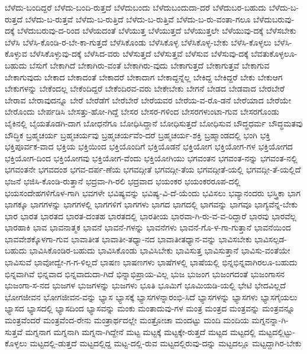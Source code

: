 {ಬೆಳೆದು-ಬಂದಿದ್ದರೆ
ಬೆಳೆದು-ಬಂದಿ-ರುತ್ತದೆ
ಬೆಳೆದುಬಂದು
ಬೆಳೆದುಬಂದುದಾ-ದರೆ
ಬೆಳೆದುಬರ-ಬಹುದು
ಬೆಳೆದು-ಬ-ರುತ್ತದೆ
ಬೆಳೆದು-ಬ-ರುತ್ತವೆ
ಬೆಳೆದು-ಬ-ರುತ್ತಿದೆ
ಬೆಳೆದು-ಬ-ರುತ್ತಿವೆ
ಬೆಳೆದು-ಬ-ರು-ವಂತಾ-ಗಲೂ
ಬೆಳೆದುಬರುವು-ದಕ್ಕೆ
ಬೆಳೆದುಬರುವು-ದ-ರಿಂದ
ಬೆಳೆಯದಂತೆ
ಬೆಳೆಯುತ್ತ
ಬೆಳೆಯುತ್ತದೆ
ಬೆಳೆಯುತ್ತಲೇ
ಬೆಳೆಯುವು-ದಕ್ಕೆ
ಬೆಳೆಸಬೇಕು
ಬೆಳೆಸಿ
ಬೆಳೆಸಿ-ಕೊಂಡಿ-ರ-ಬೇ-ಕಾ-ಗುತ್ತದೆ
ಬೆಳೆಸಿಕೊಂಡು
ಬೆಳೆಸಿಕೊಳ್ಳ
ಬೆಳೆಸಿಕೊಳ್ಳ-ಬೇಕು
ಬೆಳೆಸಿ-ಕೊಳ್ಳಲು
ಬೆಳೆಸಿ-ಕೊಳ್ಳುವ
ಬೆಳೆಸಿಕೊಳ್ಳುವು-ದಕ್ಕೆ
ಬೆಳೆಸಿದ-ವರು
ಬೆಳೆಸುತ್ತದೆ
ಬೆಳೆಸುತ್ತವೆ
ಬೆಳೆಸುವ
ಬೆಳೆಸುವು-ದಕ್ಕೆ
ಬೆವತುಕೊಳ್ಳಲೂ-ಬಹುದು
ಬೆಸುಗೆ
ಬೇಕಾಗಿದೆ
ಬೇಕಾಗಿರು-ವಂತೆ
ಬೇಕಾಗಿರು-ವುದು
ಬೇಕಾಗುತ್ತದೆ
ಬೇಕಾಗುತ್ತವೆ
ಬೇಕಾಗುವ
ಬೇಕಾಗುವುದು
ಬೇಕಾದ
ಬೇಕಾದಂತೆ
ಬೇಕಾದರೆ
ಬೇಕಾದಾಗ
ಬೇಕಾದ್ದನ್ನೆಲ್ಲ
ಬೇಕಿದ್ದ
ಬೇಕಿದ್ದರೆ
ಬೇಕು
ಬೇಕುಆಗ
ಬೇಕುಗಳನ್ನು
ಬೇಕೆಂದಲ್ಲ
ಬೇಕೆಂದಿದ್ದರೆ
ಬೇಕೆಂದಿರವ-ವರು
ಬೇಕೇಬೇಕು
ಬೇಗನೆ
ಬೇಡದ
ಬೇಡವಾದ
ಬೇರಬೇರೆ
ಬೇರಾವ
ಬೇರಾವುದನ್ನೂ
ಬೇರೆ
ಬೇರೆಡೆಗೆ
ಬೇರೆಬೇರೆ
ಬೇರೆಯವರ
ಬೇರೆಯ-ವ-ರೊ-ಡನೆ
ಬೇರೆಯಾದ
ಬೇರೆಯೇ
ಬೇರೊಂದು
ಬೇರ್ಪಡಿಸಿ
ಬೇಸತ್ತು-ಹೋ-ಗಿದ್ದೆ
ಬೇಸರ
ಬೇಸರ-ಗಳಿಂದ
ಬೇಸರಗಳುಂಟಾ-ಗುವ
ಬೇಸರಗೊಂಡು
ಬೈಕಿನಲ್ಲಿ
ಬೈಯತೊಡಗಿ-ದಾಗ
ಬೋಧನೆಗೂ
ಬೋಧಿಸಿದ್ದಾನೆ
ಬೋಧಿಸುತ್ತದೆ
ಬೋಧಿಸುವ
ಬೌದ್ಧಧರ್ಮ
ಬೌದ್ಧಮತವು
ಬೌದ್ಧಿಕ
ಬ್ರಹ್ಮಚರ್ಯ
ಬ್ರಹ್ಮಚರ್ಯವು
ಬ್ರಹ್ಮಚರ್ಯವೆಂ-ದರೆ
ಬ್ರಹ್ಮಚರ್ಯ-ಶಕ್ತಿ
ಬ್ರಹ್ಮಾಂಡದಲ್ಲಿ
ಭಂಗಿ
ಭಕ್ತಿ
ಭಕ್ತಿಪೂರ್ವಕ-ವಾದ
ಭಕ್ತಿಯ
ಭಕ್ತಿಯಿಂದ
ಭಕ್ತಿಯೊಂದಿಗೆ
ಭಕ್ತಿಯೊಡನೆ
ಭಕ್ತಿಯೋಗ
ಭಕ್ತಿಯೋಗ-ಗಳ
ಭಕ್ತಿಯೋಗದ
ಭಕ್ತಿಯೋಗ-ದಿಂದ
ಭಕ್ತಿಯೋಗವು
ಭಕ್ತಿಯೋಗ-ವೆಂದು
ಭಕ್ತಿಯೋಗಿಯು
ಭಗವಂತನ
ಭಗವಂತ-ನನ್ನು
ಭಗವಂತ-ನಲ್ಲಿ
ಭಗವಂತನೇ
ಭಗವದಂಶ
ಭಗವ-ದರ್ಪ-ಣೆಯ
ಭಗವದ್ಗೀತೆ
ಭಗವದ್ಗೀ-ತೆಯ
ಭಗವದ್ಗೀತೆ-ಯಲ್ಲಿ
ಭಗವದ್ಗೀ-ತೆ-ಯಲ್ಲಿದೆ
ಭಜನೆ
ಭಜಿಸಿ-ಕೊಂಡಿ-ರುತ್ತಾನೆ
ಭದ್ರವಾ-ಗಿ-ರಲಿ
ಭದ್ರವಾದ
ಭಯಂಕರ
ಭಯಂಕರರೂಪ-ದಲ್ಲಿ
ಭಯಸಂದೇಹಗಳಿಗೊಳ-ಗಾಗಿ
ಭವಗಳೇ
ಭವಿಷ್ಯವನ್ನು
ಭವಿಷ್ಯ-ವಿ-ದೆ-ಯೆಂದು
ಭವಿಸಲು
ಭವ್ಯಾನಂದರು
ಭಸ್ತ್ರಿಕಾ
ಭಾಗ
ಭಾಗಕ್ಕೂ
ಭಾಗಗಳನ್ನು
ಭಾಗಗಳಲ್ಲಿ
ಭಾಗಗಳಿಗೆ
ಭಾಗಗಳು
ಭಾಗದ
ಭಾಗದಲ್ಲಿ
ಭಾಗವನ್ನು
ಭಾಗವೂ
ಭಾಗ್ಯವೆನ್ನ-ಬೇಕು
ಭಾರ
ಭಾರತ
ಭಾರತದ
ಭಾರತ-ದಂತಹ
ಭಾರತದಲ್ಲಿ
ಭಾರತೀಯ
ಭಾರವಾ-ಗಿ-ರು-ವ-ವ-ರಿದ್ದಾರೆ
ಭಾರವು
ಭಾರವೆಲ್ಲ
ಭಾರಹಾಕಿ
ಭಾವ
ಭಾವನಾತ್ಮಕ
ಭಾವನೆ
ಭಾವನೆ-ಗಳನ್ನು
ಭಾವನೆಗಳು
ಭಾವನೆ-ಗೊ-ಳ-ಗಾ-ಗುತ್ತಾನೆ
ಭಾವನೆಯಿಂದ
ಭಾವವೇಶಕ್ಕೊಳಗಾ-ಗುವ
ಭಾವಾತೀತ
ಭಾವಾತೀ-ತಧ್ಯಾ-ನದ
ಭಾವಾತೀತಧ್ಯಾನ-ವನ್ನು
ಭಾವಿಸಬೇಕು
ಭಾವಿಸಲ್ಪಡ-ಬಹುದು
ಭಾವಿಸಿಕೊಂಡಿರ-ಬಹುದು
ಭಾವಿಸಿಕೊಂಡು
ಭಾವಿಸಿಬೇಕು
ಭಾವಿಸುತ್ತ
ಭಾವಿಸುತ್ತಾನೆ
ಭಾವಿಸು-ವಂತೆಯೇ
ಭಾವಿಸುವೆ
ಭಾವೋದ್ವೇ-ಗ-ಗ-ಳಿಲ್ಲದೆ
ಭಾಷಣ
ಭಾಷಣಗಳು
ಭಾಷೆಗಳಲ್ಲಿ
ಭಾಷೆಯಲ್ಲಿ
ಭಿನ್ನಭಿನ್ನವಾಗಿರಲೂ-ಬಹುದು
ಭಿನ್ನವಾಗಿವೆ
ಭಿನ್ನವಾದ
ಭಿನ್ನವಾದುದಾ-ಗಿದೆ
ಭಿನ್ನಾಭಿಪ್ರಾಯ-ವಿಲ್ಲ
ಭುಜ
ಭುಜಂಗ
ಭುಜಂಗದಂತೆ
ಭುಜಂಗಾಸನ
ಭುಜಂಗಾ-ಸ-ನದ
ಭುಜಗಳ
ಭುಜಗಳನ್ನು
ಭುಜಗಳು
ಭೂತಿ
ಭೂಮಿಗೆ
ಭೂಮಿಯಡಿ-ಯಲ್ಲಿ
ಭೇಟಿ
ಭೇದವಿಲ್ಲದೆ
ಭೋಗಜೀವನ
ಭೋಗಜೀವನ-ವನ್ನು
ಭ್ಯಾಸ
ಭ್ಯಾಸಕ್ಕೆ
ಭ್ಯಾಸಗಳನ್ನಾರಂಭಿ-ಸಿದೆ
ಭ್ಯಾಸಗಳನ್ನು
ಭ್ಯಾಸಗಳು
ಭ್ಯಾಸಗೈಯಲು
ಭ್ಯಾಸದ
ಭ್ಯಾಸದಲ್ಲಿ
ಭ್ಯಾಸದಿಂದ
ಭ್ಯಾಸವನ್ನು
ಮಂಕು
ಮಂತಾದುವು-ಗಳ
ಮಂತ್ರ
ಮಂತ್ರದ
ಮಂತ್ರವನ್ನು
ಮಂತ್ರವನ್ನೂ
ಮಂತ್ರವೆಂದರೆ
ಮಂತ್ರವೆಂದ-ರೇನು
ಮಂತ್ರಾರ್ಥದಲ್ಲೇ
ಮಂತ್ರೋಚಾ
ಮಂದಟ್ಟು
ಮಂದಿ
ಮಂದಿಯ
ಮಗ್ನನನ್ನಾ-ಗಿ-ಸುತ್ತವೆ
ಮಗ್ನನಾಗ
ಮಗ್ನನಾಗಿ
ಮಗ್ನನಾ-ಗಿದ್ದೇನೆ
ಮಟ್ಟ
ಮಟ್ಟಕ್ಕೆ
ಮಟ್ಟಕ್ಕೇ-ರುತ್ತದೆ
ಮಟ್ಟದ
ಮಟ್ಟದಲ್ಲಿ
ಮಟ್ಟದಲ್ಲಿಟ್ಟು-ಕೊಳ್ಳಲು
ಮಟ್ಟದಲ್ಲಿ-ಡುತ್ತದೆ
ಮಟ್ಟದಲ್ಲಿದ್ದ
ಮಟ್ಟ-ದಲ್ಲಿ-ರುವ
ಮಟ್ಟದಲ್ಲಿರುವು-ದನ್ನು
ಮಟ್ಟದಲ್ಲೂ
ಮಟ್ಟದ್ದಾಗಿರ-ಬೇಕು
}

